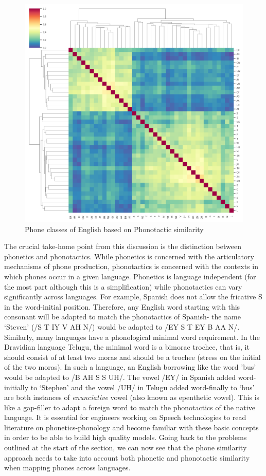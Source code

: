 \documentclass{article}
\begin{document}
\begin{figure}[h!]
    \centering
    \includegraphics[scale=0.5]{phone-contextsimilarity.png}
    \caption{Phone classes of English based on Phonotactic similarity}
    \label{fig:contsim}
\end{figure}

The crucial take-home point from this discussion is the distinction between phonetics and phonotactics. While phonetics is concerned with the articulatory mechanisms of phone production, phonotactics is concerned with the contexts in which phones occur in a given language. Phonetics is language independent (for the most part although this is a simplification) while phonotactics can vary significantly across languages. For example, Spanish does not allow the fricative S in the word-initial position. Therefore, any English word starting with this consonant will be adapted to match the phonotactics of Spanish- the name `Steven' (/S T IY V AH N/) would be adapted to /EY S T EY B AA N/. Similarly, many languages have a phonological minimal word requirement. In the Dravidian language Telugu, the minimal word is a bimorac trochee, that is, it should consist of at least two moras and should be a trochee (stress on the initial of the two moras). In such a language, an English borrowing like the word 'bus' would be adapted to /B AH S S UH/. The vowel /EY/ in Spanish added word-initially to `Stephen' and the vowel /UH/ in Telugu added word-finally to `bus' are both instances of \textit{enunciative} vowel (also known as epenthetic vowel). This is like a gap-filler to adapt a foreign word to match the phonotactics of the native language. It is essential for engineers working on Speech technologies to read literature on phonetics-phonology and become familiar with these basic concepts in order to be able to build high quality models. Going back to the problems outlined at the start of the section, we can now see that the phone similarity approach needs to take into account both phonetic and phonotactic similarity when mapping phones across languages.
\end{document}

